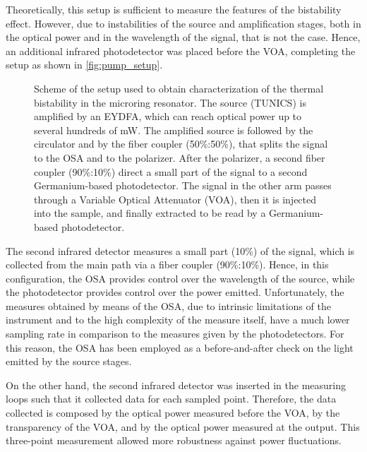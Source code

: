 Theoretically, this setup is sufficient to measure the features of the bistability effect.
However, due to instabilities of the source and amplification stages, both in the optical power and in the wavelength of the signal, that is not the case.
Hence, an additional infrared photodetector was placed before the VOA, completing the setup as shown in \autoref{fig:pump_setup}.

\begin{figure}[hbtp]
	\centering
	
	\caption{Scheme of the setup used to obtain characterization of the thermal bistability in the microring resonator.
		The source (TUNICS) is amplified by an EYDFA, which can reach optical power up to several hundreds of \si{\mW}.
		The amplified source is followed by the circulator and by the fiber coupler (50\%:50\%), that splits the signal to the OSA and to the polarizer.
		After the polarizer, a second fiber coupler (90\%:10\%) direct a small part of the signal to a second Germanium-based photodetector.
		The signal in the other arm passes through a Variable Optical Attenuator (VOA), then it is injected into the sample, and finally extracted to be read by a Germanium-based photodetector.
		}
	\label{fig:pump_setup}
\end{figure}

The second infrared detector measures a small part (10\%) of the signal, which is collected from the main path via a fiber coupler (90\%:10\%).
Hence, in this configuration, the OSA provides control over the wavelength of the source, while the photodetector provides control over the power emitted.
Unfortunately, the measures obtained by means of the OSA, due to intrinsic limitations of the instrument and to the high complexity of the measure itself, have a much lower sampling rate in comparison to the measures given by the photodetectors.
For this reason, the OSA has been employed as a before-and-after check on the light emitted by the source stages.

On the other hand, the second infrared detector was inserted in the measuring loops such that it collected data for each sampled point.
Therefore, the data collected is composed by the optical power measured before the VOA, by the transparency of the VOA, and by the optical power measured at the output.
This three-point measurement allowed more robustness against power fluctuations.


